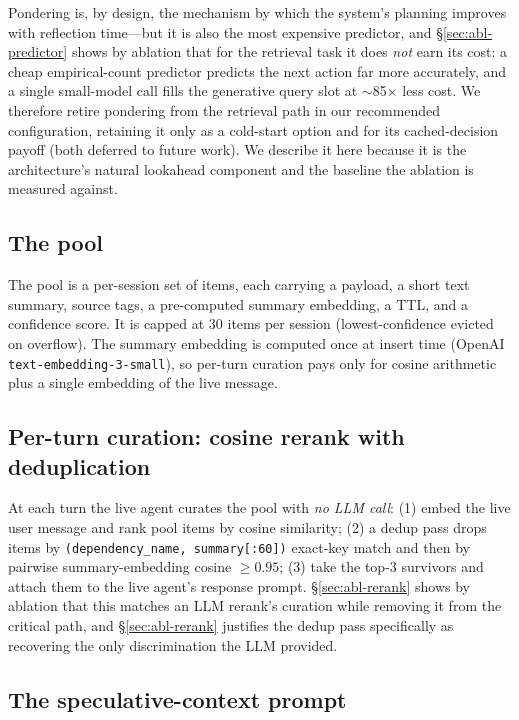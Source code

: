 \documentclass[10pt,twocolumn]{article}
\begin{document}
Pondering is, by design, the mechanism by which the system's planning improves with reflection time---but it is also the most expensive predictor, and \S\ref{sec:abl-predictor} shows by ablation that for the retrieval task it does \emph{not} earn its cost: a cheap empirical-count predictor predicts the next action far more accurately, and a single small-model call fills the generative query slot at $\sim$85$\times$ less cost. We therefore retire pondering from the retrieval path in our recommended configuration, retaining it only as a cold-start option and for its cached-decision payoff (both deferred to future work). We describe it here because it is the architecture's natural lookahead component and the baseline the ablation is measured against.

\subsection{The pool}

The pool is a per-session set of items, each carrying a payload, a short text summary, source tags, a pre-computed summary embedding, a TTL, and a confidence score. It is capped at 30 items per session (lowest-confidence evicted on overflow). The summary embedding is computed once at insert time (OpenAI \texttt{text-embedding-3-small}), so per-turn curation pays only for cosine arithmetic plus a single embedding of the live message.

\subsection{Per-turn curation: cosine rerank with deduplication}
\label{sec:rerank-design}

At each turn the live agent curates the pool with \emph{no LLM call}: (1) embed the live user message and rank pool items by cosine similarity; (2) a dedup pass drops items by \texttt{(dependency\_name, summary[:60])} exact-key match and then by pairwise summary-embedding cosine $\ge 0.95$; (3) take the top-3 survivors and attach them to the live agent's response prompt. \S\ref{sec:abl-rerank} shows by ablation that this matches an LLM rerank's curation while removing it from the critical path, and \S\ref{sec:abl-rerank} justifies the dedup pass specifically as recovering the only discrimination the LLM provided.

\subsection{The speculative-context prompt}
\label{sec:prompt-design}
\end{document}
